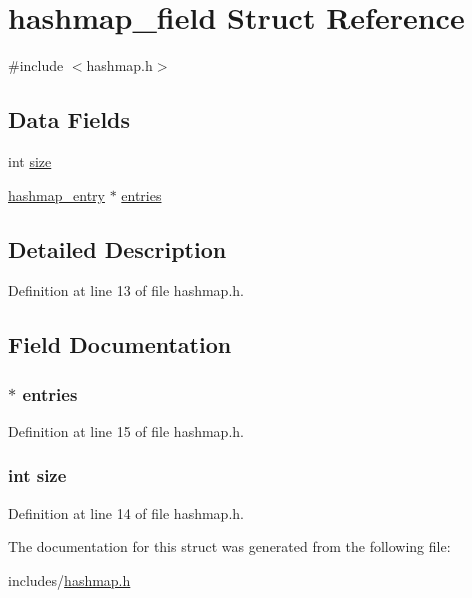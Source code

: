 \hypertarget{structhashmap__field}{\section{hashmap\+\_\+field Struct Reference}
\label{structhashmap__field}
}


{\ttfamily \#include $<$hashmap.\+h$>$}

\subsection*{Data Fields}
\begin{DoxyCompactItemize}
\item 
int \hyperlink{structhashmap__field_a439227feff9d7f55384e8780cfc2eb82}{size}
\item 
\hyperlink{structhashmap__entry}{hashmap\+\_\+entry} $\ast$ \hyperlink{structhashmap__field_a664e8f3f99c07b7156155f192c4e124e}{entries}
\end{DoxyCompactItemize}


\subsection{Detailed Description}


Definition at line 13 of file hashmap.\+h.



\subsection{Field Documentation}
\hypertarget{structhashmap__field_a664e8f3f99c07b7156155f192c4e124e}{
\subsubsection[{entries}]{$\ast$ entries}}\label{structhashmap__field_a664e8f3f99c07b7156155f192c4e124e}


Definition at line 15 of file hashmap.\+h.

\hypertarget{structhashmap__field_a439227feff9d7f55384e8780cfc2eb82}{
\subsubsection[{size}]{\setlength{\rightskip}{0pt plus 5cm}int size}}\label{structhashmap__field_a439227feff9d7f55384e8780cfc2eb82}


Definition at line 14 of file hashmap.\+h.



The documentation for this struct was generated from the following file\+:\begin{DoxyCompactItemize}
\item 
includes/\hyperlink{hashmap_8h}{hashmap.\+h}\end{DoxyCompactItemize}

